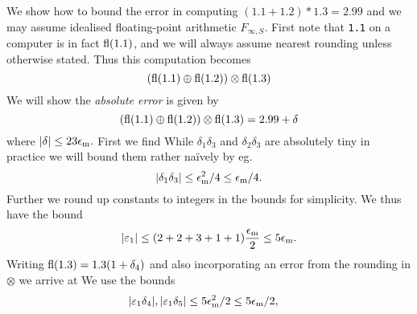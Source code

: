 \begin{example} We show how to bound the error in computing $(1.1 + 1.2) * 1.3 = 2.99$ and we may assume idealised floating-point arithmetic $F_{\ensuremath{\infty},S}$. First note that \texttt{1.1} on a computer is in fact ${\rm fl}(1.1)$, and we will always assume nearest rounding unless otherwise stated. Thus this computation becomes
\[
({\rm fl}(1.1) \ensuremath{\oplus} {\rm fl}(1.2)) \ensuremath{\otimes} {\rm fl}(1.3)
\]
We will show the \emph{absolute error} is given by
\[
({\rm fl}(1.1) \ensuremath{\oplus} {\rm fl}(1.2)) \ensuremath{\otimes} {\rm fl}(1.3) = 2.99 + \ensuremath{\delta}
\]
where $|\ensuremath{\delta}| \ensuremath{\leq}  23 \ensuremath{\epsilon}_{\rm m}.$ First we find
While $\ensuremath{\delta}_1 \ensuremath{\delta}_3$ and $\ensuremath{\delta}_2 \ensuremath{\delta}_3$ are absolutely tiny in practice we will bound them rather naïvely by eg.
\[
|\ensuremath{\delta}_1 \ensuremath{\delta}_3| \ensuremath{\leq} \ensuremath{\epsilon}_{\rm m}^2/4 \ensuremath{\leq} \ensuremath{\epsilon}_{\rm m}/4.
\]
Further we round up constants to integers in the bounds for simplicity. We thus have the bound
\[
|\ensuremath{\varepsilon}_1| \ensuremath{\leq} (2+2+3+1+1) {\ensuremath{\epsilon}_{\rm m} \over 2} \ensuremath{\leq} 5\ensuremath{\epsilon}_{\rm m}.
\]
Writing ${\rm fl}(1.3) = 1.3 (1+\ensuremath{\delta}_4)$ and also incorporating an error from the rounding in $\ensuremath{\otimes}$ we arrive at
We use the bounds
\begin{align*}
|\ensuremath{\varepsilon}_1 \ensuremath{\delta}_4|, |\ensuremath{\varepsilon}_1 \ensuremath{\delta}_5| &\ensuremath{\leq} 5 \ensuremath{\epsilon}_{\rm m}^2/2 \ensuremath{\leq} 5 \ensuremath{\epsilon}_{\rm m}/2,  \cr

\end{align*}
\end{example}
